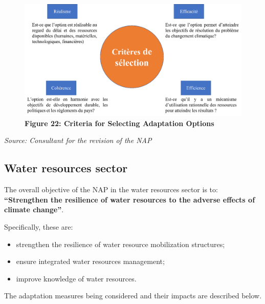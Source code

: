 \documentclass[
]{book}
\begin{document}
\begin{figure}
\centering
\includegraphics{Figures and Photos/Figure 22.png}
\caption{\textbf{Figure 22: Criteria for Selecting Adaptation Options}}
\end{figure}

\emph{Source: Consultant for the revision of the NAP}

\subsection{Water resources sector}\label{water-resources-sector}

The overall objective of the NAP in the water resources sector is to: \textbf{``Strengthen the resilience of water resources to the adverse effects of climate change''}.

Specifically, these are:

\begin{itemize}
\item
  strengthen the resilience of water resource mobilization structures;
\item
  ensure integrated water resources management;
\item
  improve knowledge of water resources.
\end{itemize}

The adaptation measures being considered and their impacts are described below.
\end{document}
